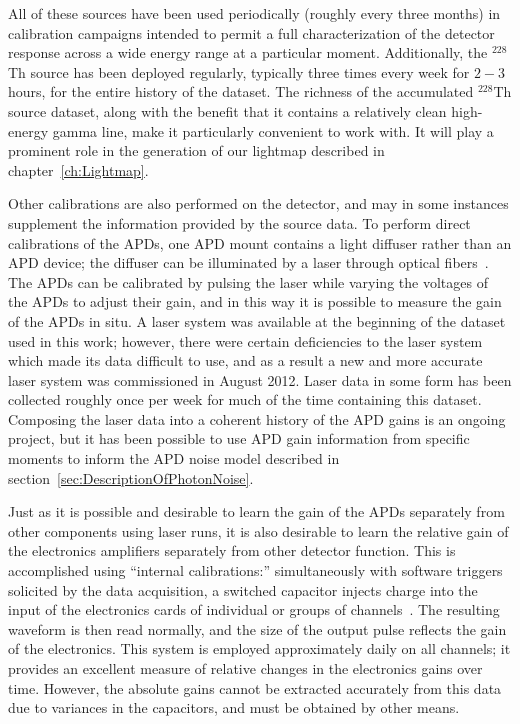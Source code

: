 All of these sources have been used periodically (roughly every three months) in calibration campaigns intended to permit a full characterization of the detector response across a wide energy range at a particular moment.  Additionally, the $^{228}$Th source has been deployed regularly, typically three times every week for $2-3$ hours, for the entire history of the dataset.  The richness of the accumulated $^{228}$Th source dataset, along with the benefit that it contains a relatively clean high-energy gamma line, make it particularly convenient to work with. It will play a prominent role in the generation of our lightmap described in chapter~\ref{ch:Lightmap}.

Other calibrations are also performed on the detector, and may in some instances supplement the information provided by the source data.  To perform direct calibrations of the APDs, one APD mount contains a light diffuser rather than an APD device; the diffuser can be illuminated by a laser through optical fibers~\cite{detectorPartI}.  The APDs can be calibrated by pulsing the laser while varying the voltages of the APDs to adjust their gain, and in this way it is possible to measure the gain of the APDs in situ.  A laser system was available at the beginning of the dataset used in this work; however, there were certain deficiencies to the laser system which made its data difficult to use, and as a result a new and more accurate laser system was commissioned in August 2012.  Laser data in some form has been collected roughly once per week for much of the time containing this dataset.  Composing the laser data into a coherent history of the APD gains is an ongoing project, but it has been possible to use APD gain information from specific moments to inform the APD noise model described in section~\ref{sec:DescriptionOfPhotonNoise}.

Just as it is possible and desirable to learn the gain of the APDs separately from other components using laser runs, it is also desirable to learn the relative gain of the electronics amplifiers separately from other detector function.  This is accomplished using ``internal calibrations:'' simultaneously with software triggers solicited by the data acquisition, a switched capacitor injects charge into the input of the electronics cards of individual or groups of channels~\cite{EXOElectronicsFunctionalSpecification}.  The resulting waveform is then read normally, and the size of the output pulse reflects the gain of the electronics.  This system is employed approximately daily on all channels; it provides an excellent measure of relative changes in the electronics gains over time.  However, the absolute gains cannot be extracted accurately from this data due to variances in the capacitors, and must be obtained by other means.

